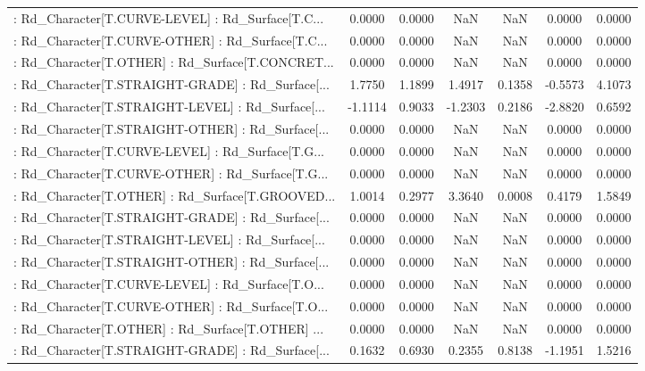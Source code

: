 \begin{longtable}{p{4cm}cccccc}
 : Rd\_Character[T.CURVE-LEVEL] : Rd\_Surface[T.C... &  0.0000 &    0.0000 &     NaN &          NaN &  0.0000 &  0.0000 \\
 : Rd\_Character[T.CURVE-OTHER] : Rd\_Surface[T.C... &  0.0000 &    0.0000 &     NaN &          NaN &  0.0000 &  0.0000 \\
 : Rd\_Character[T.OTHER] : Rd\_Surface[T.CONCRET... &  0.0000 &    0.0000 &     NaN &          NaN &  0.0000 &  0.0000 \\
 : Rd\_Character[T.STRAIGHT-GRADE] : Rd\_Surface[... &  1.7750 &    1.1899 &  1.4917 &       0.1358 & -0.5573 &  4.1073 \\
 : Rd\_Character[T.STRAIGHT-LEVEL] : Rd\_Surface[... & -1.1114 &    0.9033 & -1.2303 &       0.2186 & -2.8820 &  0.6592 \\
 : Rd\_Character[T.STRAIGHT-OTHER] : Rd\_Surface[... &  0.0000 &    0.0000 &     NaN &          NaN &  0.0000 &  0.0000 \\
 : Rd\_Character[T.CURVE-LEVEL] : Rd\_Surface[T.G... &  0.0000 &    0.0000 &     NaN &          NaN &  0.0000 &  0.0000 \\
 : Rd\_Character[T.CURVE-OTHER] : Rd\_Surface[T.G... &  0.0000 &    0.0000 &     NaN &          NaN &  0.0000 &  0.0000 \\
 : Rd\_Character[T.OTHER] : Rd\_Surface[T.GROOVED... &  1.0014 &    0.2977 &  3.3640 &       0.0008 &  0.4179 &  1.5849 \\
 : Rd\_Character[T.STRAIGHT-GRADE] : Rd\_Surface[... &  0.0000 &    0.0000 &     NaN &          NaN &  0.0000 &  0.0000 \\
 : Rd\_Character[T.STRAIGHT-LEVEL] : Rd\_Surface[... &  0.0000 &    0.0000 &     NaN &          NaN &  0.0000 &  0.0000 \\
 : Rd\_Character[T.STRAIGHT-OTHER] : Rd\_Surface[... &  0.0000 &    0.0000 &     NaN &          NaN &  0.0000 &  0.0000 \\
 : Rd\_Character[T.CURVE-LEVEL] : Rd\_Surface[T.O... &  0.0000 &    0.0000 &     NaN &          NaN &  0.0000 &  0.0000 \\
 : Rd\_Character[T.CURVE-OTHER] : Rd\_Surface[T.O... &  0.0000 &    0.0000 &     NaN &          NaN &  0.0000 &  0.0000 \\
 : Rd\_Character[T.OTHER] : Rd\_Surface[T.OTHER] ... &  0.0000 &    0.0000 &     NaN &          NaN &  0.0000 &  0.0000 \\
 : Rd\_Character[T.STRAIGHT-GRADE] : Rd\_Surface[... &  0.1632 &    0.6930 &  0.2355 &       0.8138 & -1.1951 &  1.5216 \\

\end{longtable}

